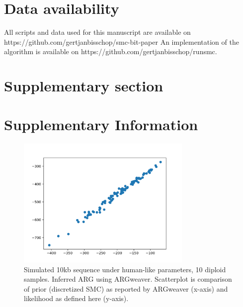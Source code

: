 \documentclass{article}
\newcommand{\supplementarysection}{%
  \setcounter{figure}{0}%
  \let\oldthefigure\thefigure%
  \renewcommand{\thefigure}{S\oldthefigure}%
  \section{Supplementary section}%
}
\begin{document}


\section{Data availability}

All scripts and data used for this manuscript are available on https://github.com/gertjanbisschop/smc-bit-paper
An implementation of the algorithm is available on https://github.com/gertjanbisschop/runsmc.
\FloatBarrier



\pagebreak

\supplementarysection
\section*{Supplementary Information}


\begin{figure}[!ht]
\centering
\includegraphics[width=0.75\textwidth]{figures/supplementary-figs/argweaver_vs_runsmc.png}
\caption{Simulated 10kb sequence under human-like parameters, 10 diploid samples. Inferred ARG using ARGweaver. Scatterplot is comparison of prior (discretized SMC) as reported by ARGweaver (x-axis) and likelihood as defined here (y-axis).}
 \label{sup:fig:vs-argweaver}
\end{figure}
\end{document}
